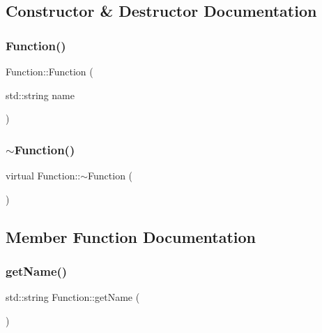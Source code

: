 \subsection{Constructor \& Destructor Documentation}
\mbox{\label{classFunction_aa339244413ee4f0e959a2f61dd874b43}} 
\subsubsection{\texorpdfstring{Function()}{Function()}}
{\footnotesize\ttfamily Function\+::\+Function (\begin{DoxyParamCaption}\item[{std\+::string}]{name }\end{DoxyParamCaption})}

\mbox{\label{classFunction_a8697b2e490a4314a7ccbb17aea8ce537}} 
\subsubsection{\texorpdfstring{$\sim$\+Function()}{~Function()}}
{\footnotesize\ttfamily virtual Function\+::$\sim$\+Function (\begin{DoxyParamCaption}{ }\end{DoxyParamCaption})\hspace{0.3cm}{\ttfamily [virtual]}}



\subsection{Member Function Documentation}
\mbox{\label{classFunction_a5b7d859d767e8a9c19fc5b81a0d10395}} 
\subsubsection{\texorpdfstring{get\+Name()}{getName()}}
{\footnotesize\ttfamily std\+::string Function\+::get\+Name (\begin{DoxyParamCaption}{ }\end{DoxyParamCaption})}

